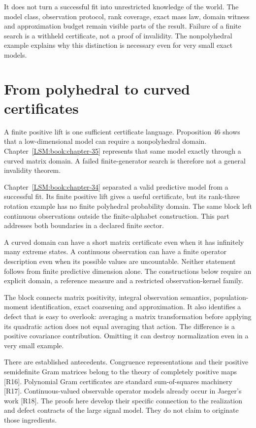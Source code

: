 It does not turn a successful fit into unrestricted knowledge of the
world. The model class, observation protocol, rank coverage, exact mass
law, domain witness and approximation budget remain visible parts of the
result. Failure of a finite search is a withheld certificate, not a
proof of invalidity. The nonpolyhedral example explains why this
distinction is necessary even for very small exact models.

\section{From polyhedral to curved certificates}\label{LSM:from-polyhedral-to-curved-certificates}

A finite positive lift is one sufficient certificate language.
Proposition 46 shows that a low-dimensional model can require a
nonpolyhedral domain. Chapter~\ref{LSM:book:chapter-35} represents that same model exactly through
a curved matrix domain. A failed finite-generator search is therefore
not a general invalidity theorem.


\label{LSM:part-v.-curved-domains-and-continuous-observations}

Chapter~\ref{LSM:book:chapter-34} separated a valid predictive model from a successful fit. Its
finite positive lift gives a useful certificate, but its rank-three
rotation example has no finite polyhedral probability domain. The same
block left continuous observations outside the finite-alphabet
construction. This part addresses both boundaries in a declared finite
sector.

A curved domain can have a short matrix certificate even when it has
infinitely many extreme states. A continuous observation can have a
finite operator description even when its possible values are
uncountable. Neither statement follows from finite predictive dimension
alone. The constructions below require an explicit domain, a reference
measure and a restricted observation-kernel family.

The block connects matrix positivity, integral observation semantics,
population-moment identification, exact coarsening and approximation. It
also identifies a defect that is easy to overlook: averaging a matrix
transformation before applying its quadratic action does not equal
averaging that action. The difference is a positive covariance
contribution. Omitting it can destroy normalization even in a very small
example.

There are established antecedents. Congruence representations and their
positive semidefinite Gram matrices belong to the theory of completely
positive maps {[}R16{]}. Polynomial Gram certificates are standard
sum-of-squares machinery {[}R17{]}. Continuous-valued observable
operator models already occur in Jaeger's work {[}R18{]}. The proofs
here develop their specific connection to the realization and defect
contracts of the large signal model. They do not claim to originate
those ingredients.

